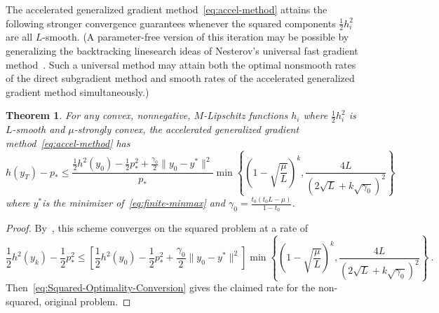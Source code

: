 \documentclass[sn-mathphys,Numbered]{sn-jnl}%
\newtheorem{theorem}{Theorem}%
\begin{document}
\begin{appendices}
{%

The accelerated generalized gradient method~\eqref{eq:accel-method} attains the following stronger convergence guarantees whenever the squared components $\frac{1}{2}h_i^2$ are all $L$-smooth. (A parameter-free version of this iteration may be possible by generalizing the backtracking linesearch ideas of Nesterov's universal fast gradient method~\cite{Nesterov2015}. Such a universal method may attain both the optimal nonsmooth rates of the direct subgradient method and smooth rates of the accelerated generalized gradient method simultaneously.)
\begin{theorem}\label{thm:acclerated-gradient-convergence}
    For any convex, nonnegative, $M$-Lipschitz functions $h_i$ where $\frac{1}{2}h_i^2$ is $L$-smooth and $\mu$-strongly convex, the accelerated generalized gradient method~\eqref{eq:accel-method} has
    $$ h(y_T)-p_* \leq \frac{\frac{1}{2}h^2(y_0) - \frac{1}{2}p^2_* + \frac{\gamma_0}{2}\|y_0-y^*\|^2}{p_*}\min\left\{\left(1-\sqrt{\frac{\mu}{L}}\right)^k, \frac{4L}{(2\sqrt{L} +k\sqrt{\gamma_0})^2}\right\} $$
    where $y^*$is the minimizer of~\eqref{eq:finite-minmax} and $\gamma_0=\frac{t_0(t_0L-\mu)}{1-t_0}$.
\end{theorem}
\begin{proof}
By~\cite[Theorem 2.3.5]{nesterov2018lectures}, this scheme converges on the squared problem at a rate of
$$ \frac{1}{2}h^2(y_k) - \frac{1}{2}p^2_* \leq \left[\frac{1}{2}h^2(y_0) - \frac{1}{2}p^2_* + \frac{\gamma_0}{2}\|y_0-y^*\|^2\right] \min\left\{\left(1-\sqrt{\frac{\mu}{L}}\right)^k, \frac{4L}{(2\sqrt{L} +k\sqrt{\gamma_0})^2}\right\}\ .$$
Then~\eqref{eq:Squared-Optimality-Conversion} gives the claimed rate for the non-squared, original problem.
\end{proof}

}
\end{appendices}
\end{document}
